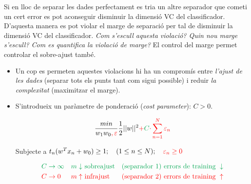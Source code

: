 \begin{figure}[H]
	\centering
\end{figure}


Si en lloc de separar les dades perfectament es tria un altre separador que cometi un cert error es pot aconseguir disminuir la dimensió VC del classificador. D'aquesta manera es pot violar el marge de separació per tal de disminuir la dimensió VC del classificador. \emph{Com s'escull aquesta violació? Quin nou marge s'escull? Com es quantifica la violació de marge?} El control del marge permet controlar el sobre-ajust també. 

\begin{itemize}
	\item Un cop es permeten aquestes violacions hi ha un compromís entre \emph{l'ajust de les dades} (separar tots els punts tant com sigui possible) i reduir \emph{la complexitat} (maximitzar el marge).
	
	\item S'introdueix un paràmetre de ponderació (\emph{cost parameter}): $C > 0$.
	
	$$
	\frac{min}{w_1 w_0 \textcolor{red}{,\varepsilon}} \frac{1}{2} ||w||^2 \textcolor{red}{+} \textcolor{Green}{C} \textcolor{red}{\cdot \sum_{n=1}^N \varepsilon_n}
	$$
	
	Subjecte a $t_n (w^T x_n + w_0) \ge 1; \quad (1 \le n \le N); \quad \textcolor{red}{\varepsilon_n \ge 0}$
	
	\begin{align*}
		& \textcolor{Green}{C \to \infty} & \textcolor{Green}{m \downarrow} & 
		\textcolor{Green}{\text{ sobreajust}} & \textcolor{Green}{\text{(separador 1)}} &
		\textcolor{Green}{\text{ errors de training } \downarrow} \\
		& \textcolor{red}{C \to 0} & \textcolor{red}{m \uparrow} & 
		\textcolor{red}{\text{ infrajust}} & \textcolor{red}{\text{(separador 2)}} &
		\textcolor{red}{\text{ errors de training } \uparrow}
	\end{align*}
\end{itemize}

